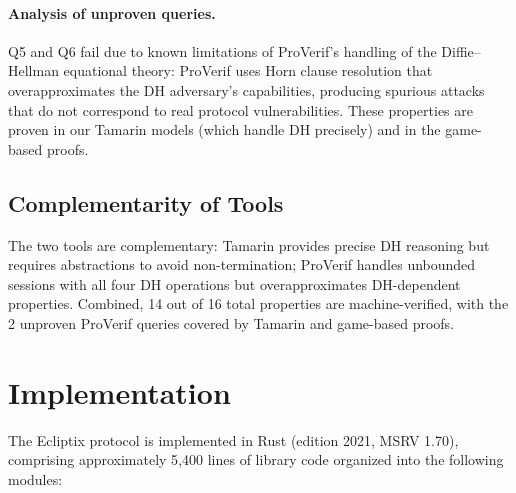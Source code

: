 \documentclass[11pt,a4paper]{article}
\theoremstyle{definition}
\begin{document}
\paragraph{Analysis of unproven queries.}
Q5 and Q6 fail due to known limitations of ProVerif's handling of the Diffie--Hellman equational theory: ProVerif uses Horn clause resolution that overapproximates the DH adversary's capabilities, producing spurious attacks that do not correspond to real protocol vulnerabilities. These properties are proven in our Tamarin models (which handle DH precisely) and in the game-based proofs.

\subsection{Complementarity of Tools}

The two tools are complementary: Tamarin provides precise DH reasoning but requires abstractions to avoid non-termination; ProVerif handles unbounded sessions with all four DH operations but overapproximates DH-dependent properties. Combined, 14 out of 16 total properties are machine-verified, with the 2 unproven ProVerif queries covered by Tamarin and game-based proofs.


\section{Implementation}\label{sec:implementation}

The Ecliptix protocol is implemented in Rust (edition 2021, MSRV 1.70), comprising approximately 5{,}400 lines of library code organized into the following modules:
\end{document}
